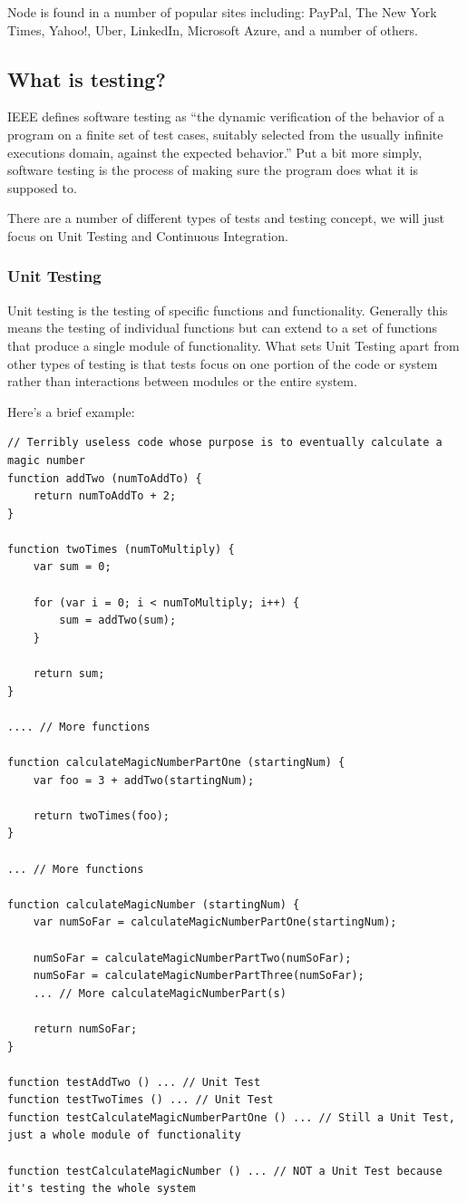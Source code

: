\documentclass[11pt]{article}
\begin{document}
Node is found in a number of popular sites including: PayPal, The New York Times, Yahoo!, Uber, LinkedIn, Microsoft Azure, and a number of others. \cite{Node}

\subsection{What is testing?}
IEEE defines software testing as ``the dynamic verification of the behavior of a program on a finite set of test cases, suitably selected from the usually infinite executions domain, against the expected behavior.'' \cite{TestingDefinition} Put a bit more simply, software testing is the process of making sure the program does what it is supposed to.

There are a number of different types of tests and testing concept, we will just focus on Unit Testing and Continuous Integration.

\subsubsection{Unit Testing}
Unit testing is the testing of specific functions and functionality. Generally this means the testing of individual functions but can extend to a set of functions that produce a single module of functionality. What sets Unit Testing apart from other types of testing is that tests focus on one portion of the code or system rather than interactions between modules or the entire system.

Here's a brief example:
\begin{lstlisting}
// Terribly useless code whose purpose is to eventually calculate a magic number
function addTwo (numToAddTo) {
	return numToAddTo + 2;
}

function twoTimes (numToMultiply) {
	var sum = 0;

	for (var i = 0; i < numToMultiply; i++) {
		sum = addTwo(sum);
	}

	return sum;
}

.... // More functions

function calculateMagicNumberPartOne (startingNum) {
	var foo = 3 + addTwo(startingNum);

	return twoTimes(foo);
}

... // More functions

function calculateMagicNumber (startingNum) {
	var numSoFar = calculateMagicNumberPartOne(startingNum);

	numSoFar = calculateMagicNumberPartTwo(numSoFar);
	numSoFar = calculateMagicNumberPartThree(numSoFar);
	... // More calculateMagicNumberPart(s)

	return numSoFar;
}

function testAddTwo () ... // Unit Test
function testTwoTimes () ... // Unit Test
function testCalculateMagicNumberPartOne () ... // Still a Unit Test, just a whole module of functionality

function testCalculateMagicNumber () ... // NOT a Unit Test because it's testing the whole system
\end{lstlisting}
\end{document}
